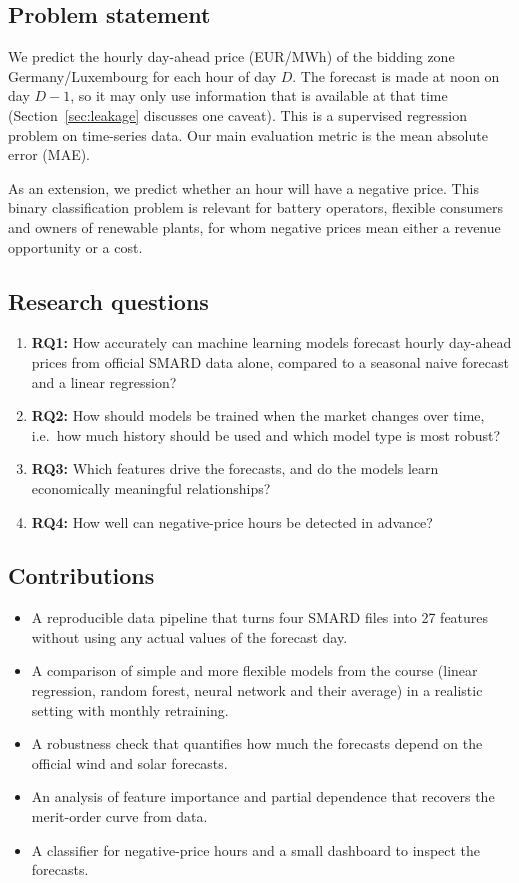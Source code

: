 \documentclass[12pt,oneside]{article}
\begin{document}
\subsection{Problem statement}

We predict the hourly day-ahead price (EUR/MWh) of the bidding zone Germany/Luxembourg for each hour of day $D$. The forecast is made at noon on day $D-1$, so it may only use information that is available at that time (Section~\ref{sec:leakage} discusses one caveat). This is a supervised regression problem on time-series data. Our main evaluation metric is the mean absolute error (MAE).

As an extension, we predict whether an hour will have a negative price. This binary classification problem is relevant for battery operators, flexible consumers and owners of renewable plants, for whom negative prices mean either a revenue opportunity or a cost.

\subsection{Research questions}

\begin{enumerate}
    \item \textbf{RQ1:} How accurately can machine learning models forecast hourly day-ahead prices from official SMARD data alone, compared to a seasonal naive forecast and a linear regression?
    \item \textbf{RQ2:} How should models be trained when the market changes over time, i.e.\ how much history should be used and which model type is most robust?
    \item \textbf{RQ3:} Which features drive the forecasts, and do the models learn economically meaningful relationships?
    \item \textbf{RQ4:} How well can negative-price hours be detected in advance?
\end{enumerate}

\subsection{Contributions}

\begin{itemize}
    \item A reproducible data pipeline that turns four SMARD files into 27 features without using any actual values of the forecast day.
    \item A comparison of simple and more flexible models from the course (linear regression, random forest, neural network and their average) in a realistic setting with monthly retraining.
    \item A robustness check that quantifies how much the forecasts depend on the official wind and solar forecasts.
    \item An analysis of feature importance and partial dependence that recovers the merit-order curve from data.
    \item A classifier for negative-price hours and a small dashboard to inspect the forecasts.
\end{itemize}
\end{document}
